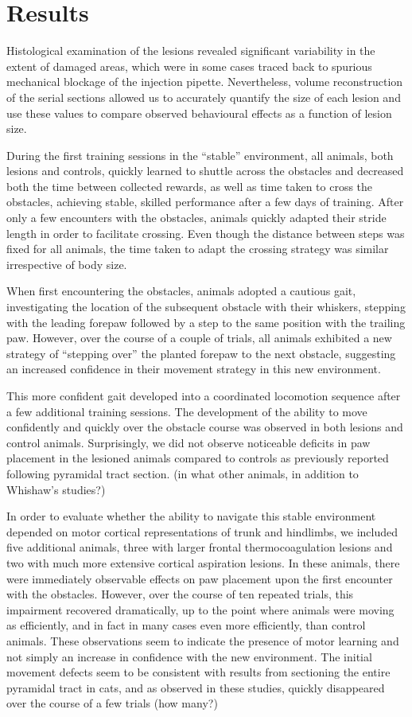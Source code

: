 \section{Results}

Histological examination of the lesions revealed significant variability in the extent of damaged areas, which were in some cases traced back to spurious mechanical blockage of the injection pipette. Nevertheless, volume reconstruction of the serial sections allowed us to accurately quantify the size of each lesion and use these values to compare observed behavioural effects as a function of lesion size.

During the first training sessions in the ``stable'' environment, all animals, both lesions and controls, quickly learned to shuttle across the obstacles and decreased both the time between collected rewards, as well as time taken to cross the obstacles, achieving stable, skilled performance after a few days of training. After only a few encounters with the obstacles, animals quickly adapted their stride length in order to facilitate crossing. Even though the distance between steps was fixed for all animals, the time taken to adapt the crossing strategy was similar irrespective of body size.

When first encountering the obstacles, animals adopted a cautious gait, investigating the location of the subsequent obstacle with their whiskers, stepping with the leading forepaw followed by a step to the same position with the trailing paw. However, over the course of a couple of trials, all animals exhibited a new strategy of ``stepping over'' the planted forepaw to the next obstacle, suggesting an increased confidence in their movement strategy in this new environment.

This more confident gait developed into a coordinated locomotion sequence after a few additional training sessions. The development of the ability to move confidently and quickly over the obstacle course was observed in both lesions and control animals. Surprisingly, we did not observe noticeable deficits in paw placement in the lesioned animals compared to controls as previously reported following pyramidal tract section. (in what other animals, in addition to Whishaw's studies?)

In order to evaluate whether the ability to navigate this stable environment depended on motor cortical representations of trunk and hindlimbs, we included five additional animals, three with larger frontal thermocoagulation lesions and two with much more extensive cortical aspiration lesions. In these animals, there were immediately observable effects on paw placement upon the first encounter with the obstacles. However, over the course of ten repeated trials, this impairment recovered dramatically, up to the point where animals were moving as efficiently, and in fact in many cases even more efficiently, than control animals. These observations seem to indicate the presence of motor learning and not simply an increase in confidence with the new environment. The initial movement defects seem to be consistent with results from sectioning the entire pyramidal tract in cats, and as observed in these studies, quickly disappeared over the course of a few trials (how many?)

